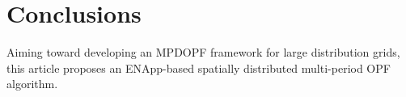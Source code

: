 \documentclass{article}
\begin{document}
\section{Conclusions}
Aiming toward developing an MPDOPF framework for large distribution grids, this article proposes an ENApp-based spatially distributed multi-period OPF algorithm.  
\end{document}
